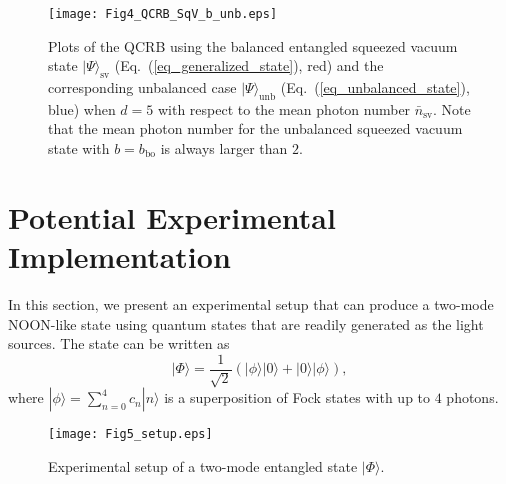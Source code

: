 \documentclass[aps,pra,reprint,showpacs,groupedaddress]{revtex4-1}
\begin{document}
\begin{figure}[!t]
\centering
\texttt{[image: Fig4\_QCRB\_SqV\_b\_unb.eps]}
\caption{Plots of the QCRB using the balanced entangled squeezed vacuum state $|\Psi\rangle_\text{sv}$ (Eq.~(\ref{eq_generalized_state}), red) and the corresponding unbalanced case $|\Psi\rangle_\text{unb}$ (Eq.~(\ref{eq_unbalanced_state}), blue) when $d=5$ with respect to the mean photon number $\bar{n}_\text{sv}$. Note that the mean photon number for the unbalanced squeezed vacuum state with $b = b_\text{bo}$ is always larger than $2$.}
\label{Fig3_QCRB_comparison_b=cVSbnot=c}
\end{figure}




\section{Potential Experimental Implementation}

In this section, we present an experimental setup that can produce a two-mode NOON-like state using quantum states that are readily generated as the light sources.  The state can be written as
\begin{equation}
    |\Phi\rangle = \frac{1}{\sqrt{2}} (|\phi\rangle|0\rangle + |0\rangle|\phi\rangle),
    \label{Eq_Experimental_state}
\end{equation}
where $|\phi\rangle = \sum_{n=0}^{4} c_n |n\rangle$ is a superposition of Fock states with up to $4$ photons.


\begin{figure}[!t]
  \centering
  \texttt{[image: Fig5\_setup.eps]}
  \caption{Experimental setup of a two-mode entangled state $|\Phi\rangle$.}
  \label{Fig4_setup}
\end{figure}
\end{document}
